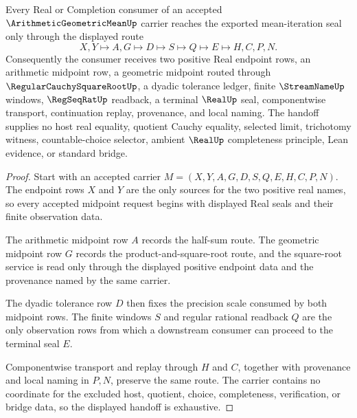 \begin{theorem}
\label{thm:arithmetic-geometric-mean-real-seal-handoff}
Every Real or Completion consumer of an accepted $\ArithmeticGeometricMeanUp$ carrier reaches the exported mean-iteration seal only through the displayed route
$$
X,Y\longmapsto A,G\longmapsto D\longmapsto S\longmapsto Q\longmapsto E\longmapsto H,C,P,N .
$$
Consequently the consumer receives two positive Real endpoint rows, an arithmetic midpoint row, a geometric midpoint routed through $\RegularCauchySquareRootUp$, a dyadic tolerance ledger, finite $\StreamNameUp$ windows, $\RegSeqRatUp$ readback, a terminal $\RealUp$ seal, componentwise transport, continuation replay, provenance, and local naming. The handoff supplies no host real equality, quotient Cauchy equality, selected limit, trichotomy witness, countable-choice selector, ambient $\RealUp$ completeness principle, Lean evidence, or standard bridge.
\end{theorem}
\begin{proof}
Start with an accepted carrier $M=(X,Y,A,G,D,S,Q,E,H,C,P,N)$. The endpoint rows $X$ and $Y$ are the only sources for the two positive real names, so every accepted midpoint request begins with displayed Real seals and their finite observation data.

The arithmetic midpoint row $A$ records the half-sum route. The geometric midpoint row $G$ records the product-and-square-root route, and the square-root service is read only through the displayed positive endpoint data and the provenance named by the same carrier.

The dyadic tolerance row $D$ then fixes the precision scale consumed by both midpoint rows. The finite windows $S$ and regular rational readback $Q$ are the only observation rows from which a downstream consumer can proceed to the terminal seal $E$.

Componentwise transport and replay through $H$ and $C$, together with provenance and local naming in $P,N$, preserve the same route. The carrier contains no coordinate for the excluded host, quotient, choice, completeness, verification, or bridge data, so the displayed handoff is exhaustive.
\end{proof}

